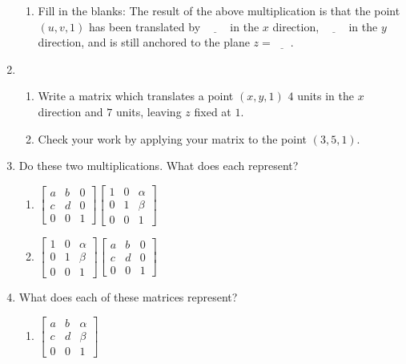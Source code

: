 \documentclass[../gatm.tex]{subfiles}
\begin{document}
\begin{enumerate}
\begin{enumerate}
\item Fill in the blanks: The result of the above multiplication is that the point $(u,v,1)$ has been translated by $\underline{\phantom{0000}}$ in the $x$ direction, $\underline{\phantom{0000}}$ in the $y$ direction, and is still anchored to the plane $z=\underline{\phantom{000}}$.
\end{enumerate}
\item \begin{enumerate}
\item Write a matrix which translates a point $(x,y,1)$ $4$ units in the $x$ direction and $7$ units, leaving $z$ fixed at $1$.
\item Check your work by applying your matrix to the point $(3,5,1)$.
\end{enumerate}
\item Do these two multiplications. What does each represent?
\begin{multicols}{2}
\begin{enumerate}
\item $\left[\begin{array}{ccc}a & b & 0 \\ c & d & 0 \\ 0 & 0 & 1 \end{array}\right]\left[\begin{array}{ccc} 1 & 0 & \alpha \\ 0 & 1 & \beta \\ 0 & 0 & 1 \end{array}\right]$
\item $\left[\begin{array}{ccc} 1 & 0 & \alpha \\ 0 & 1 & \beta \\ 0 & 0 & 1 \end{array}\right]\left[\begin{array}{ccc}a & b & 0 \\ c & d & 0 \\ 0 & 0 & 1 \end{array}\right]$
\end{enumerate}
\end{multicols}
\item What does each of these matrices represent?
\begin{multicols}{2}
\begin{enumerate}
\item $\left[\begin{array}{ccc} a & b & \alpha \\ c & d & \beta \\ 0 & 0 & 1 \end{array}\right]$

\end{enumerate}
\end{multicols}
\end{enumerate}
\end{document}
